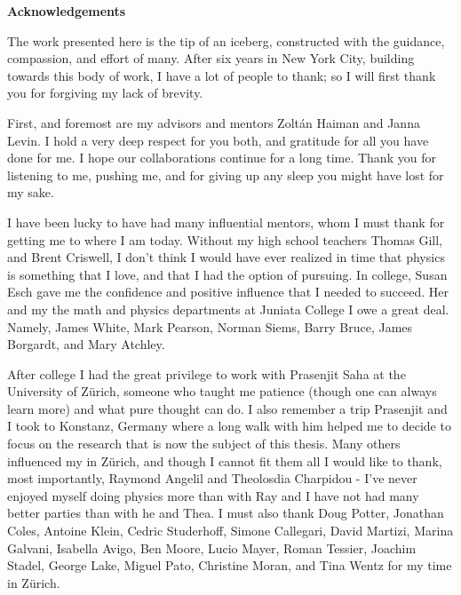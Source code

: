 \newpage

\begin{center}
    {\large \bf Acknowledgements }
\end{center}

\vspace{-0.2cm}


The work presented here is the tip of an iceberg, constructed with the
guidance, compassion, and effort of many. After six years in New York City,
building towards this body of work, I have a lot of people to thank; so
I will first thank you for forgiving my lack of brevity.


First, and foremost are my advisors and mentors Zolt\'an Haiman and Janna
Levin. I hold a very deep respect for you both, and gratitude for all you
have done for me. I hope our collaborations continue for a long time. Thank
you for listening to me, pushing me, and for giving up any sleep you might
have lost for my sake.



I have been lucky to have had many influential mentors, whom I must thank for
getting me to where I am today. Without my high school teachers Thomas Gill,
and Brent Criswell, I don't think I would have ever realized in time that
physics is something that I love, and that I had the option of pursuing. In
college, Susan Esch gave me the confidence and positive influence that I
needed to succeed. Her and my the math and physics departments at Juniata College I owe a great deal. Namely, James White, Mark Pearson, Norman Siems, Barry Bruce, James Borgardt, and Mary Atchley.


After college I had the great privilege to work with Prasenjit Saha at the
University of Z\"urich, someone who taught me patience (though one can always
learn more) and what pure thought can do. I also remember a trip Prasenjit and
I took to Konstanz, Germany where a long walk with him helped me to decide
to focus on the research that is now the subject of this thesis.
Many others influenced my in Z\"urich, and though I cannot fit them all I would
like to thank, most importantly, Raymond Angelil and Theolosdia Charpidou -
I've never enjoyed myself doing physics more than with Ray and I have not had
many better parties than with he and Thea. I must also thank Doug Potter,
Jonathan Coles, Antoine Klein, Cedric Studerhoff, Simone Callegari, David
Martizi, Marina Galvani, Isabella Avigo, Ben Moore, Lucio Mayer, Roman
Tessier, Joachim Stadel, George Lake, Miguel Pato, Christine Moran, and Tina
Wentz for my time in Z\"urich.


